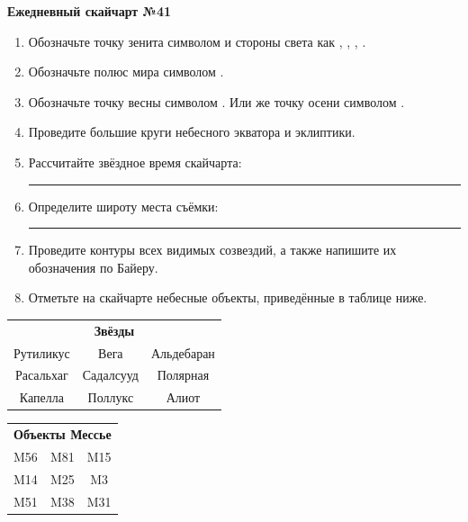 \documentclass{./SAS-class-skygen}
\begin{document}
    
    
    
	\begin{center}
		\large\textbf{Ежедневный скайчарт №41}
	\end{center}

	\begin{enumerate}
		\item Обозначьте точку зенита символом  и стороны света как , , , .
		\item Обозначьте полюс мира символом .
		\item Обозначьте точку весны символом \Aries. Или же точку осени символом \Libra.
		\item Проведите большие круги небесного экватора и эклиптики.
		\item Рассчитайте звёздное время скайчарта: \rule{2cm}{0.4pt}
		\item Определите широту места съёмки: \rule{2cm}{0.4pt}
		\item Проведите контуры всех видимых созвездий, а также напишите их обозначения по Байеру.
		\item Отметьте на скайчарте небесные объекты, приведённые в таблице ниже.
	\end{enumerate}
	
    \vspace{0.5cm}

    \begin{table}[h!]
    \centering
    \begin{tabular}{ccc}
    \multicolumn{3}{c}{\textbf{Звёзды}} \\ Рутиликус & Вега & Альдебаран \\
Расальхаг & Садалсууд & Полярная \\
Капелла & Поллукс & Алиот \\

\end{tabular}
    \hfill
    \begin{tabular}{ccc}
    \multicolumn{3}{c}{\textbf{Объекты Мессье}} \\ M56 & M81 & M15 \\
M14 & M25 & M3 \\
M51 & M38 & M31 \\

\end{tabular}
    \end{table}
	
\end{document}
